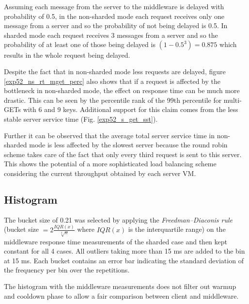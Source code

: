 \documentclass[report.tex]{subfiles}
\begin{document}
Assuming each message from the server to the middleware is delayed with probability of 0.5, in the non-sharded mode each request receives only one message from a server and so the probability of not being delayed is 0.5. In sharded mode each request receives 3 messages from a server and so the probability of at least one of those being delayed is $(1-0.5^3)=0.875$ which results in the whole request being delayed.

Despite the fact that in non-sharded mode less requests are delayed, figure \ref{exp52_ns_rt_mget_perc} also shows that if a request is affected by the bottleneck in non-sharded mode, the effect on response time can be much more drastic. This can be seen by the percentile rank of the 99th percentile for multi-GETs with 6 and 9 keys. Additional support for this claim comes from the less stable server service time (Fig. \ref{exp52_s_get_sst}).

Further it can be observed that the average total server service time in non-sharded mode is less affected by the slowest server because the round robin scheme takes care of the fact that only every third request is sent to this server. This shows the potential of a more sophisticated load balancing scheme considering the current throughput obtained by each server VM.



\subsection{Histogram}

The bucket size of 0.21 was selected by applying the \emph{Freedman–Diaconis rule} (bucket size $ = 2 \frac{IQR(x)}{\sqrt[3]{n}}$ where $IQR(x)$ is the interquartile range) on the middleware response time measurements of the sharded case and then kept constant for all 4 cases. All outliers taking more than 15 ms are added to the bin at 15 ms. Each bucket contains an error bar indicating the standard deviation of the frequency per bin over the repetitions.

The histogram with the middleware measurements does not filter out warmup and cooldown phase to allow a fair comparison between client and middleware. 
\end{document}

